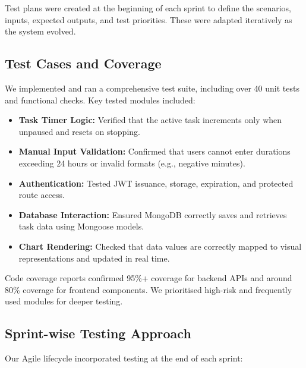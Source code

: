 \documentclass[12pt,a4paper]{article}
\begin{document}
Test plans were created at the beginning of each sprint to define the scenarios, inputs, expected outputs, and test priorities. These were adapted iteratively as the system evolved.

\subsection{Test Cases and Coverage}

We implemented and ran a comprehensive test suite, including over 40 unit tests and functional checks. Key tested modules included:

\begin{itemize}
    \item \textbf{Task Timer Logic:} Verified that the active task increments only when unpaused and resets on stopping.
    \item \textbf{Manual Input Validation:} Confirmed that users cannot enter durations exceeding 24 hours or invalid formats (e.g., negative minutes).
    \item \textbf{Authentication:} Tested JWT issuance, storage, expiration, and protected route access.
    \item \textbf{Database Interaction:} Ensured MongoDB correctly saves and retrieves task data using Mongoose models.
    \item \textbf{Chart Rendering:} Checked that data values are correctly mapped to visual representations and updated in real time.
\end{itemize}

Code coverage reports confirmed 95\%+ coverage for backend APIs and around 80\% coverage for frontend components. We prioritised high-risk and frequently used modules for deeper testing.

\subsection{Sprint-wise Testing Approach}

Our Agile lifecycle incorporated testing at the end of each sprint:
\end{document}
